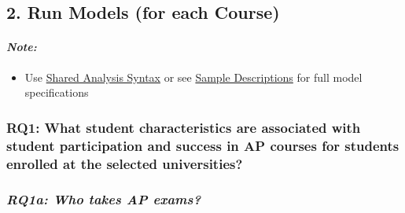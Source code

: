 \documentclass[]{article}
\newenvironment{Shaded}{\begin{snugshade}}{\end{snugshade}}
\newcommand{\KeywordTok}[1]{\textcolor[rgb]{0.13,0.29,0.53}{\textbf{#1}}}
\newcommand{\DecValTok}[1]{\textcolor[rgb]{0.00,0.00,0.81}{#1}}
\newcommand{\StringTok}[1]{\textcolor[rgb]{0.31,0.60,0.02}{#1}}
\newcommand{\CommentTok}[1]{\textcolor[rgb]{0.56,0.35,0.01}{\textit{#1}}}
\newcommand{\OperatorTok}[1]{\textcolor[rgb]{0.81,0.36,0.00}{\textbf{#1}}}
\newcommand{\AlertTok}[1]{\textcolor[rgb]{0.94,0.16,0.16}{#1}}
\newcommand{\NormalTok}[1]{#1}
\providecommand{\tightlist}{%
  \setlength{\itemsep}{0pt}\setlength{\parskip}{0pt}}
\let\oldparagraph\paragraph
\renewcommand{\paragraph}[1]{\oldparagraph{#1}\mbox{}}
\begin{document}
\begin{Shaded}
\end{Shaded}

\subsection{2. Run Models (for each
Course)}\label{run-models-for-each-course}

\paragraph{\texorpdfstring{\emph{Note:}}{Note:}}\label{note-10}

\begin{itemize}
\tightlist
\item
  Use
  \href{https://github.com/seismic2020/WG1-P4/tree/master/Shared\%20Analysis}{Shared
  Analysis Syntax} or see
  \href{https://docs.google.com/spreadsheets/d/1rN8W_iz1mr7lEzBGfdTZHa45wKOSLiSF8VEpChCPsmE/edit\#gid=129222174}{Sample
  Descriptions} for full model specifications
\end{itemize}

\subsubsection{RQ1: What student characteristics are associated with
student participation and success in AP courses for students enrolled at
the selected
universities?}\label{rq1-what-student-characteristics-are-associated-with-student-participation-and-success-in-ap-courses-for-students-enrolled-at-the-selected-universities}

\subsubsection{\texorpdfstring{\emph{RQ1a: Who takes AP
exams?}}{RQ1a: Who takes AP exams?}}\label{rq1a-who-takes-ap-exams}
\end{document}
